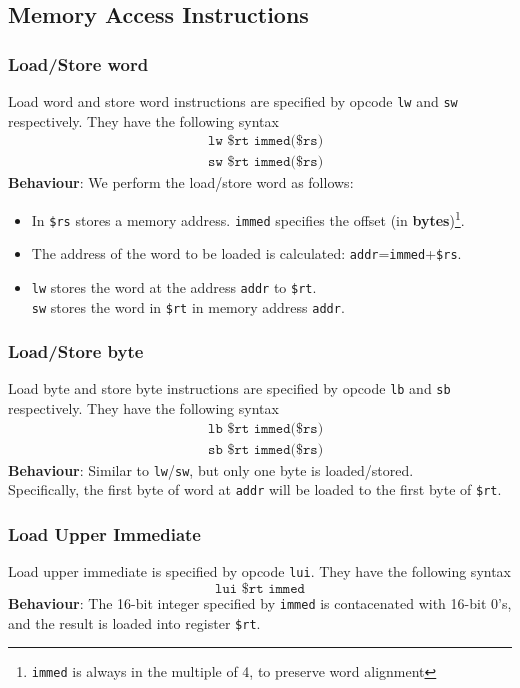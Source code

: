 \documentclass[12pt]{article}
\theoremstyle{definition}
\begin{document}
\subsection{Memory Access Instructions}
\subsubsection{Load/Store word}
Load word and store word instructions are specified by opcode \texttt{lw} and \texttt{sw} respectively. They have the following syntax
\begin{align*}
&\texttt{lw \$rt immed(\$rs)}\\
&\texttt{sw \$rt immed(\$rs)}
\end{align*}
\textbf{Behaviour}: We perform the load/store word as follows:
\begin{itemize}
  \item In \texttt{\$rs} stores a memory address. \texttt{immed} specifies the offset (in \textbf{bytes})\footnote{\texttt{immed} is always in the multiple of 4, to preserve word alignment}.
  \item The address of the word to be loaded is calculated: \texttt{addr}=\texttt{immed}+\texttt{\$rs}.
  \item \texttt{lw} stores the word at the address \texttt{addr} to \texttt{\$rt}.\\\texttt{sw} stores the word in \texttt{\$rt} in memory address \texttt{addr}.
\end{itemize}
\subsubsection{Load/Store byte}
Load byte and store byte instructions are specified by opcode \texttt{lb} and \texttt{sb} respectively. They have the following syntax
\begin{align*}
&\texttt{lb \$rt immed(\$rs)}\\
&\texttt{sb \$rt immed(\$rs)}
\end{align*}
\textbf{Behaviour}: Similar to \texttt{lw}/\texttt{sw}, but only one byte is loaded/stored.\\
Specifically, the first byte of word at \texttt{addr} will be loaded to the first byte of \texttt{\$rt}.
\subsubsection{Load Upper Immediate}
Load upper immediate is specified by opcode \texttt{lui}. They have the following syntax
\[
\texttt{lui \$rt immed}
\]
\textbf{Behaviour}: The 16-bit integer specified by \texttt{immed} is contacenated with 16-bit 0's, and the result is loaded into register \texttt{\$rt}.
\end{document}

